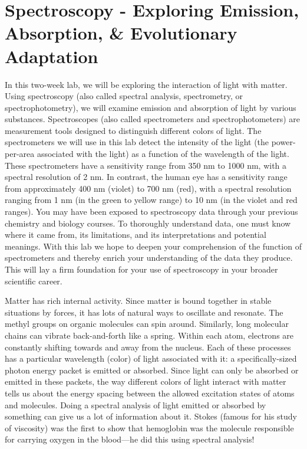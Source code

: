 \chapter{Spectroscopy - Exploring Emission, Absorption, \& Evolutionary Adaptation}
\thispagestyle{fancy}
%
In this two-week lab, we will be exploring the interaction of light with matter. 
Using spectroscopy (also called spectral analysis, spectrometry, or spectrophotometry), we will examine emission and absorption of light by various substances. 
Spectroscopes (also called spectrometers and spectrophotometers) are measurement tools designed to distinguish different colors of light. 
The spectrometers we will use in this lab detect the intensity of the light (the power-per-area associated with the light) as a function of the wavelength of the light. 
These spectrometers have a sensitivity range from 350 nm to 1000 nm, with a spectral resolution of 2 nm. 
In contrast, the human eye has a sensitivity range from approximately 400 nm (violet) to 700 nm (red), with a spectral resolution ranging from 1 nm (in the green to yellow range) to 10 nm (in the violet and red ranges). 
You may have been exposed to spectroscopy data through your previous chemistry and biology courses. 
To thoroughly understand data, one must know where it came from, its limitations, and its interpretations and potential meanings. 
With this lab we hope to deepen your comprehension of the function of spectrometers and thereby enrich your understanding of the data they produce. 
This will lay a firm foundation for your use of spectroscopy in your broader scientific career. 
\par
Matter has rich internal activity. 
Since matter is bound together in stable situations by forces, it has lots of natural ways to oscillate and resonate. 
The methyl groups on organic molecules can spin around. 
Similarly, long molecular chains can vibrate back-and-forth like a spring. 
Within each atom, electrons are constantly shifting towards and away from the nucleus. 
Each of these processes has a particular wavelength (color) of light associated with it: a specifically-sized photon energy packet is emitted or absorbed. 
Since light can only be absorbed or emitted in these packets, the way different colors of light interact with matter tells us about the energy spacing between the allowed excitation states of atoms and molecules. 
Doing a spectral analysis of light emitted or absorbed by something can give us a lot of information about it. 
Stokes (famous for his study of viscosity) was the first to show that hemoglobin was the molecule responsible for carrying oxygen in the blood—he did this using spectral analysis! 
